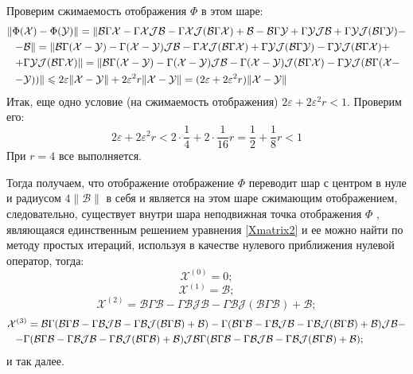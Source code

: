 
Проверим сжимаемость отображения $\Phi$ в этом шаре:
\begin{multline*}
\|\Phi (\mathcal{X}) - \Phi (\mathcal{Y}) \| = \| \mathcal{B}\Gamma \mathcal{X} - \Gamma \mathcal{XJB} - \Gamma \mathcal{XJ}(\mathcal{B}\Gamma\mathcal{X}) + \mathcal{B} - \mathcal{B}\Gamma \mathcal{Y} + \Gamma \mathcal{YJB} + \Gamma \mathcal{YJ}(\mathcal{B}\Gamma\mathcal{Y}) - \\ 
\shoveleft{ -\mathcal{B}\| = \| \mathcal{B}\Gamma (\mathcal{X-Y}) - \Gamma (\mathcal{X-Y})\mathcal{JB} - \Gamma\mathcal{XJ}(\mathcal{B}\Gamma\mathcal{X}) + \Gamma \mathcal{YJ} (\mathcal{B}\Gamma\mathcal{Y}) - \Gamma\mathcal{YJ}(\mathcal{B}\Gamma\mathcal{X}) +}\\
\shoveleft{ + \Gamma \mathcal{YJ}(\mathcal{B}\Gamma\mathcal{X}) \| = \| \mathcal{B}\Gamma(\mathcal{X-Y}) - \Gamma\mathcal{(X-Y)}\mathcal{JB} - \Gamma (\mathcal{X- Y}) \mathcal{J}(\mathcal{B}\Gamma\mathcal{X}) - \Gamma \mathcal{YJ}(\mathcal{B}\Gamma(\mathcal{X}-}\\
\shoveleft{ -\mathcal{Y})) \| \leqslant 2\varepsilon \| \mathcal{X-Y} \| + 2\varepsilon ^2 r\| \mathcal{X-Y} \| = (2\varepsilon + 2\varepsilon ^2 r)\| \mathcal{X-Y} \|}\\ 
\end{multline*}
Итак, еще одно условие (на сжимаемость отображения) $2\varepsilon + 2\varepsilon ^2 r < 1.$ Проверим его:
$$
2\varepsilon + 2\varepsilon ^2 r < 2 \cdot \frac{1}{4} + 2 \cdot \frac{1}{16} r = \frac{1}{2} + \frac{1}{8} r < 1
$$
При $r = 4$ все выполняется.

Тогда получаем, что отображение отображение $\Phi$ переводит шар с центром в нуле и радиусом $4\|\mathcal{B}\|$ в себя и является на этом шаре сжимающим отображением, следовательно, существует внутри шара неподвижная точка отображения $\Phi$ , являющаяся единственным решением уравнения \eqref{Xmatrix2} и ее можно найти по методу простых итераций, используя в качестве нулевого приближения нулевой оператор, тогда:
$$
\mathcal{X}^{(0)} = 0;
$$
$$
\mathcal{X}^{(1)} = \mathcal{B};
$$
$$
\mathcal{X}^{(2)} = \mathcal{B}\Gamma\mathcal{B} - \Gamma\mathcal{BJB} - \Gamma\mathcal{BJ}(\mathcal{B}\Gamma\mathcal{B}) + \mathcal{B};
$$
\begin{multline*}
\mathcal{X}^{(3)} = \mathcal{B}\Gamma(\mathcal{B}\Gamma\mathcal{B} - \Gamma\mathcal{BJB} - \Gamma\mathcal{BJ}(\mathcal{B}\Gamma\mathcal{B}) + \mathcal{B})-\Gamma(\mathcal{B}\Gamma\mathcal{B} - \Gamma\mathcal{BJB} - \Gamma\mathcal{BJ}(\mathcal{B}\Gamma\mathcal{B}) + \mathcal{B})\mathcal{JB} - \\
\shoveleft{- \Gamma(\mathcal{B}\Gamma\mathcal{B} - \Gamma\mathcal{BJB} - \Gamma\mathcal{BJ}(\mathcal{B}\Gamma\mathcal{B}) + \mathcal{B})\mathcal{JB} \Gamma(\mathcal{B}\Gamma\mathcal{B} - \Gamma\mathcal{BJB} - \Gamma\mathcal{BJ}(\mathcal{B}\Gamma\mathcal{B}) + \mathcal{B});}
\end{multline*}
и так далее.

